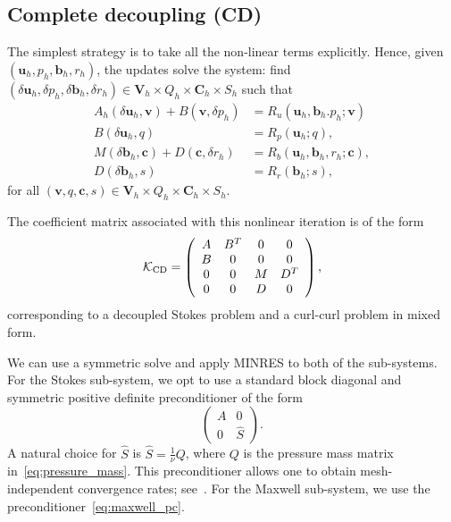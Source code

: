 \documentclass{siamltex}
\newcommand{\uu}[1]{\boldsymbol #1}                     %
\begin{document}
\subsection{Complete decoupling (CD)}

The simplest strategy is to take all the non-linear terms explicitly. Hence, given $(\uu{u}_h,p_h,\uu{b}_h,r_h)$, the updates  solve the system: find  $(\delta \uu{u}_h,\delta p_h,\delta \uu{b}_h,\delta r_h)\in\uu{V}_h\times Q_h\times \uu{C}_h\times S_h$ such that
\begin{equation}
\label{eq:picard_explicit_OC}
\begin{split}
A_h(\delta\uu{u}_h, \uu{v}) + B(\uu{v}, \delta p_h) & = R_u(\uu{u}_h,\uu{b}_h.p_h;\uu{v})\\[.1cm]
B(\delta\uu{u}_h,q)&= R_p(\uu{u}_h;q), \\[.1cm]
M(\delta \uu{b}_h,\uu{c})+
D(\uu{c},\delta r_h)&= R_b(\uu{u}_h,\uu{b}_h,r_h;\uu{c}),\\[.1cm]
D(\delta \uu{b}_h,s)&=R_r(\uu{b}_h;s),
\end{split}
\end{equation}
for all $(\uu{v},q, \uu{c},s)\in\uu{V}_h\times Q_h\times \uu{C}_h\times S_h$.

The coefficient matrix associated with this nonlinear iteration is of the form
\begin{equation}
\label{eq:matrix_CD}
\mathcal{K}_{\rm CD} =
\left(
\begin{array}{cccc}
A & B^T & 0 & 0\\
B & 0 & 0 & 0 \\
0 & 0 & M & D^T\\
0 & 0 & D & 0
\end{array}
\right),
\end{equation}
corresponding to a decoupled Stokes problem and a curl-curl problem in mixed form.

We can use a symmetric solve and apply MINRES to both of the sub-systems. For the Stokes sub-system, we opt to use a standard block diagonal and symmetric positive definite preconditioner of the form
\begin{equation*}
\label{eq:mhd_pc_explicit2_1}
\begin{pmatrix}
A & 0 \\
0 & \widehat{S}
\end{pmatrix}.
\end{equation*}
A natural choice for $\widehat{S}$ is $\widehat{S} = \frac{1}{\nu}Q$, where $Q$ is the pressure mass matrix in~\eqref{eq:pressure_mass}. This preconditioner allows one to obtain mesh-independent convergence rates;
see~\cite{Elman96,Klawonn99}. For the Maxwell sub-system, we use the preconditioner~\eqref{eq:maxwell_pc}.
\end{document}
